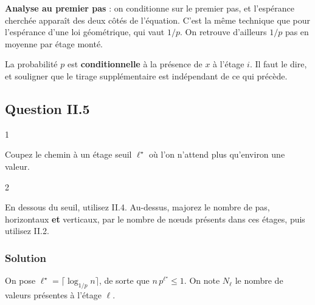 \documentclass[11pt,a4paper]{article}
\begin{document}
\begin{methode}

\textbf{Analyse au premier pas} : on conditionne sur le premier pas, et l'espérance cherchée apparaît des deux côtés de l'équation. C'est la même technique que pour l'espérance d'une loi géométrique, qui vaut \(1/p\). On retrouve d'ailleurs \(1/p\) pas en moyenne par étage monté.

\end{methode}

\begin{piege}

La probabilité \(p\) est \textbf{conditionnelle} à la présence de \(x\) à l'étage \(i\). Il faut le dire, et souligner que le tirage supplémentaire est indépendant de ce qui précède.

\end{piege}

\hypertarget{question-ii.5}{%
\subsection{Question II.5}\label{question-ii.5}}

\begin{indication}{1}

Coupez le chemin à un étage seuil \(\ell^\star\) où l'on n'attend plus qu'environ une valeur.

\end{indication}

\begin{indication}{2}

En dessous du seuil, utilisez II.4. Au-dessus, majorez le nombre de pas, horizontaux \textbf{et} verticaux, par le nombre de nœuds présents dans ces étages, puis utilisez II.2.

\end{indication}

\hypertarget{solution-14}{%
\subsubsection{Solution}\label{solution-14}}

On pose \(\ell^\star=\lceil\log_{1/p}n\rceil\), de sorte que \(n\,p^{\ell^\star}\le1\). On note \(N_\ell\) le nombre de valeurs présentes à l'étage \(\ell\).
\end{document}
